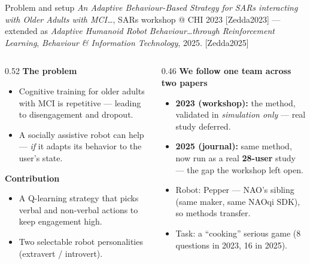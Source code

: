 \documentclass[aspectratio=169,10pt]{beamer}
\newcommand{\refnum}[1]{{\footnotesize\color{giuaccent}[#1]}}
\begin{document}
\begin{frame}{Problem and setup}
  \footnotesize \emph{An Adaptive Behaviour-Based Strategy for SARs interacting with Older Adults with MCI\ldots}, SARs workshop @ CHI 2023 \refnum{Zedda2023} --- extended as \emph{Adaptive Humanoid Robot Behaviour\ldots through Reinforcement Learning}, \emph{Behaviour \& Information Technology}, 2025. \refnum{Zedda2025}
  \vspace{0.4em}
  \begin{columns}[T]
    \begin{column}{0.52\textwidth}
      \textbf{The problem}
      \begin{itemize}\footnotesize
        \item Cognitive training for older adults with MCI is repetitive --- leading to disengagement and dropout.
        \item A socially assistive robot can help --- \emph{if} it adapts its behavior to the user's state.
      \end{itemize}
      \textbf{Contribution}
      \begin{itemize}\footnotesize
        \item A Q-learning strategy that picks verbal and non-verbal actions to keep engagement high.
        \item Two selectable robot personalities (extravert / introvert).
      \end{itemize}
    \end{column}
    \begin{column}{0.46\textwidth}
      \textbf{We follow one team across two papers}
      \begin{itemize}\footnotesize
        \item \textbf{2023 (workshop):} the method, validated in \emph{simulation only} --- real study deferred.
        \item \textbf{2025 (journal):} same method, now run as a real \textbf{28-user} study --- the gap the workshop left open.
        \item Robot: Pepper --- NAO's sibling (same maker, same NAOqi SDK), so methods transfer.
        \item Task: a ``cooking'' serious game (8 questions in 2023, 16 in 2025).
      \end{itemize}
    \end{column}
  \end{columns}
\end{frame}
 
\end{document}
